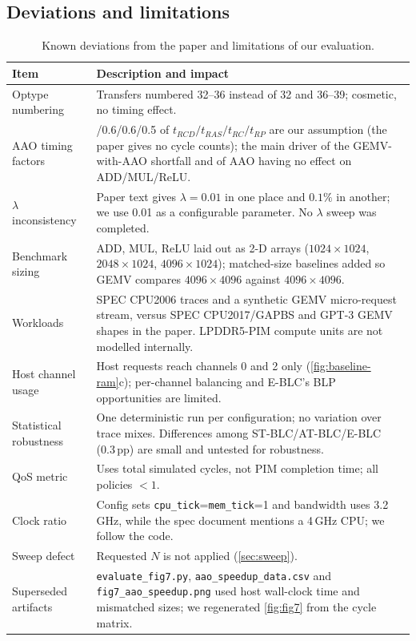 \documentclass[conference]{IEEEtran}
\newcommand{\cmd}[1]{\texttt{\footnotesize #1}}
\newcommand{\stblc}{ST-BLC}
\newcommand{\atblc}{AT-BLC}
\newcommand{\eblc}{E-BLC}
\begin{document}
\subsection{Deviations and limitations}
\begin{table}[!t]
\centering
\caption{Known deviations from the paper and limitations of our evaluation.}\label{tab:deviations}
\footnotesize
\begin{tabularx}{\textwidth}{@{}>{\raggedright\arraybackslash}p{3.7cm}>{\raggedright\arraybackslash}X@{}}
\toprule
\textbf{Item} & \textbf{Description and impact}\\
\midrule
Optype numbering & Transfers numbered 32--36 instead of 32 and 36--39; cosmetic, no timing effect.\\
AAO timing factors & 0.5/0.6/0.6/0.5 of $t_{RCD}/t_{RAS}/t_{RC}/t_{RP}$ are our assumption (the paper gives no cycle counts); the main driver of the GEMV-with-AAO shortfall and of AAO having no effect on ADD/MUL/ReLU.\\
$\lambda$ inconsistency & Paper text gives $\lambda=0.01$ in one place and $0.1\%$ in another; we use 0.01 as a configurable parameter. No $\lambda$ sweep was completed.\\
Benchmark sizing & ADD, MUL, ReLU laid out as 2-D arrays ($1024\times1024$, $2048\times1024$, $4096\times1024$); matched-size baselines added so GEMV compares $4096\times4096$ against $4096\times4096$.\\
Workloads & SPEC CPU2006 traces and a synthetic GEMV micro-request stream, versus SPEC CPU2017/GAPBS and GPT-3 GEMV shapes in the paper. LPDDR5-PIM compute units are not modelled internally.\\
Host channel usage & Host requests reach channels 0 and 2 only (\cref{fig:baseline-ram}c); per-channel balancing and \eblc's BLP opportunities are limited.\\
Statistical robustness & One deterministic run per configuration; no variation over trace mixes. Differences among \stblc/\atblc/\eblc{} (0.3\,pp) are small and untested for robustness.\\
QoS metric & Uses total simulated cycles, not PIM completion time; all policies $<1$.\\
Clock ratio & Config sets \cmd{cpu\_tick}=\cmd{mem\_tick}=1 and bandwidth uses 3.2\,GHz, while the spec document mentions a 4\,GHz CPU; we follow the code.\\
Sweep defect & Requested $N$ is not applied (\cref{sec:sweep}).\\
Superseded artifacts & \cmd{evaluate\_fig7.py}, \cmd{aao\_speedup\_data.csv} and \cmd{fig7\_aao\_speedup.png} used host wall-clock time and mismatched sizes; we regenerated \cref{fig:fig7} from the cycle matrix.\\
\bottomrule
\end{tabularx}
\end{table}
\end{document}
